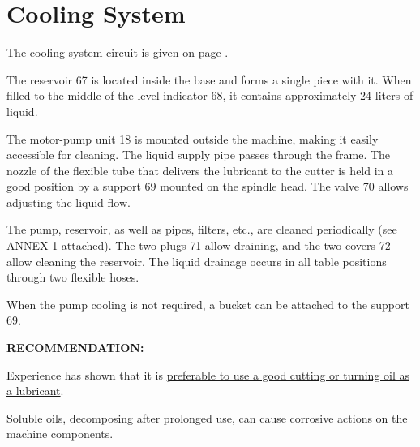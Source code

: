 \chapter{Cooling System}

The cooling system circuit is given on page \pageref{fig:cooling_system}.

The reservoir 67 is located inside the base and forms a single piece with it. When filled to the middle of the level indicator 68, it contains approximately 24 liters of liquid.

The motor-pump unit 18 is mounted outside the machine, making it easily accessible for cleaning. The liquid supply pipe passes through the frame. The nozzle of the flexible tube that delivers the lubricant to the cutter is held in a good position by a support 69 mounted on the spindle head. The valve 70 allows adjusting the liquid flow.

The pump, reservoir, as well as pipes, filters, etc., are cleaned periodically (see ANNEX-1 attached). The two plugs 71 allow draining, and the two covers 72 allow cleaning the reservoir. The liquid drainage occurs in all table positions through two flexible hoses.

When the pump cooling is not required, a bucket can be attached to the support 69.

\textbf{RECOMMENDATION:}

Experience has shown that it is \underline{preferable to use a good cutting or turning oil as a lubricant}.

Soluble oils, decomposing after prolonged use, can cause corrosive actions on the machine components.
